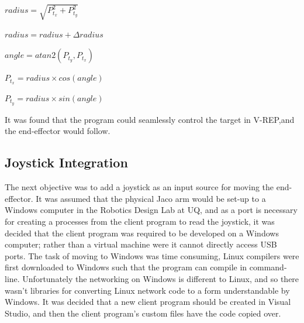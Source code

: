 \documentclass[12pt,openany,a4paper]{book}
\begin{document}
\begin{center}
\vspace{\baselineskip}
$radius = \sqrt{P_{t_x}^2 + P_{t_y}^2}$

\vspace{\baselineskip}
$radius = radius + \Delta radius$

\vspace{\baselineskip}
$angle = atan2(P_{t_y}, P_{t_x})$

\vspace{\baselineskip}
$P_{t_x} = radius \times cos(angle)$

\vspace{\baselineskip}
$P_{t_y} = radius \times sin(angle)$
\end{center}

\vspace{\baselineskip}
It was found that the program could seamlessly control the target in V-REP,and the end-effector would follow.

\subsection{Joystick Integration}
The next objective was to add a joystick as an input source for moving the end-effector. It was assumed that the physical Jaco arm would be set-up to a Windows computer in the Robotics Design Lab at UQ, and as a port is necessary for creating a processes from the client program to read the joystick, it was decided that the client program was required to be developed on a Windows computer; rather than a virtual machine were it cannot directly access USB ports. The task of moving to Windows was time consuming, Linux compilers were first downloaded to Windows such that the program can compile in command-line. Unfortunately the networking on Windows is different to Linux, and so there wasn't libraries for converting Linux network code to a form understandable by Windows. It was decided that a new client program should be created in Visual Studio, and then the client program's custom files have the code copied over.
\end{document}
